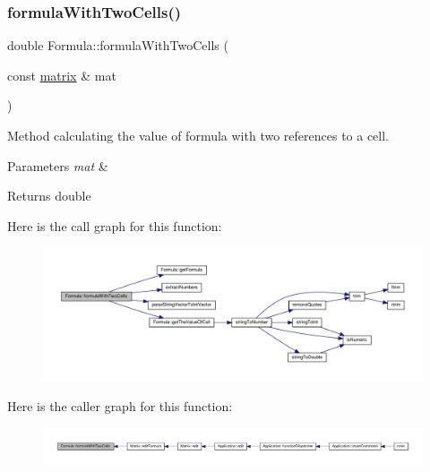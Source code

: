 \subsubsection{\texorpdfstring{formula\+With\+Two\+Cells()}{formulaWithTwoCells()}}
{\footnotesize\ttfamily double Formula\+::formula\+With\+Two\+Cells (\begin{DoxyParamCaption}\item[{const \hyperlink{formula_8h_a869e2a5deeb3daa4c82d6bc91cf20d92}{matrix} \&}]{mat }\end{DoxyParamCaption})}

Method calculating the value of formula with two references to a cell. 
\begin{DoxyParams}{Parameters}
{\em mat} & \\
\hline
\end{DoxyParams}
\begin{DoxyReturn}{Returns}
double 
\end{DoxyReturn}
Here is the call graph for this function\+:
\nopagebreak
\begin{figure}[H]
\begin{center}
\leavevmode
\includegraphics[width=350pt]{class_formula_a518bc97bd50f1cc5573be7d3f8cb6253_cgraph}
\end{center}
\end{figure}
Here is the caller graph for this function\+:
\nopagebreak
\begin{figure}[H]
\begin{center}
\leavevmode
\includegraphics[width=350pt]{class_formula_a518bc97bd50f1cc5573be7d3f8cb6253_icgraph}
\end{center}
\end{figure}
\mbox{\label{class_formula_a2159ffdb34d80f2bee422eee89fc871a}} 
